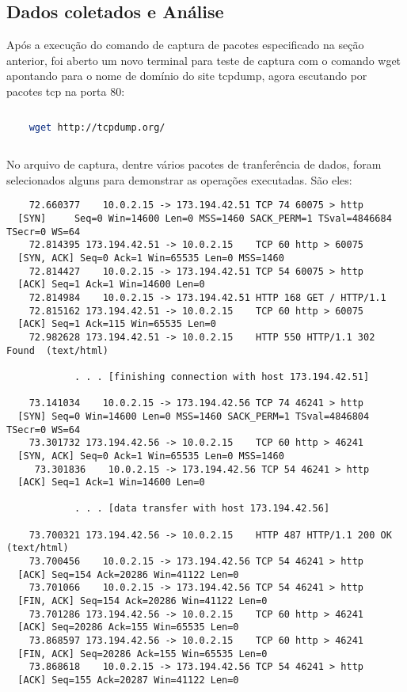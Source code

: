 \documentclass[a4paper]{report} %
\begin{document}
\subsection{Dados coletados e Análise}
\label{sub_http_dados}

	Após a execução do comando de captura de pacotes especificado na seção anterior, foi aberto um novo terminal para teste de captura com o comando wget apontando para o nome de domínio do site tcpdump, agora escutando por pacotes tcp na porta 80:

\begin{lstlisting}[language=bash]
	
	wget http://tcpdump.org/ 
	
\end{lstlisting}

	No arquivo de captura, dentre vários pacotes de tranferência de dados, foram selecionados alguns para demonstrar as operações executadas. São eles:
	
\begin{lstlisting}
	72.660377    10.0.2.15 -> 173.194.42.51 TCP 74 60075 > http 
  [SYN] 	Seq=0 Win=14600 Len=0 MSS=1460 SACK_PERM=1 TSval=4846684 TSecr=0 WS=64
	72.814395 173.194.42.51 -> 10.0.2.15    TCP 60 http > 60075 
  [SYN, ACK] Seq=0 Ack=1 Win=65535 Len=0 MSS=1460
	72.814427    10.0.2.15 -> 173.194.42.51 TCP 54 60075 > http 
  [ACK] Seq=1 Ack=1 Win=14600 Len=0
	72.814984    10.0.2.15 -> 173.194.42.51 HTTP 168 GET / HTTP/1.1 
	72.815162 173.194.42.51 -> 10.0.2.15    TCP 60 http > 60075 
  [ACK] Seq=1 Ack=115 Win=65535 Len=0
	72.982628 173.194.42.51 -> 10.0.2.15    HTTP 550 HTTP/1.1 302 Found  (text/html)
	
     		. . . [finishing connection with host 173.194.42.51]
	
	73.141034    10.0.2.15 -> 173.194.42.56 TCP 74 46241 > http 
  [SYN] Seq=0 Win=14600 Len=0 MSS=1460 SACK_PERM=1 TSval=4846804 TSecr=0 WS=64
	73.301732 173.194.42.56 -> 10.0.2.15    TCP 60 http > 46241 
  [SYN, ACK] Seq=0 Ack=1 Win=65535 Len=0 MSS=1460
     73.301836    10.0.2.15 -> 173.194.42.56 TCP 54 46241 > http 
  [ACK] Seq=1 Ack=1 Win=14600 Len=0
     
     		. . . [data transfer with host 173.194.42.56]
     					 					
	73.700321 173.194.42.56 -> 10.0.2.15    HTTP 487 HTTP/1.1 200 OK  (text/html)
	73.700456    10.0.2.15 -> 173.194.42.56 TCP 54 46241 > http 
  [ACK] Seq=154 Ack=20286 Win=41122 Len=0     					
	73.701066    10.0.2.15 -> 173.194.42.56 TCP 54 46241 > http 
  [FIN, ACK] Seq=154 Ack=20286 Win=41122 Len=0
	73.701286 173.194.42.56 -> 10.0.2.15    TCP 60 http > 46241
  [ACK] Seq=20286 Ack=155 Win=65535 Len=0
	73.868597 173.194.42.56 -> 10.0.2.15    TCP 60 http > 46241 
  [FIN, ACK] Seq=20286 Ack=155 Win=65535 Len=0
	73.868618    10.0.2.15 -> 173.194.42.56 TCP 54 46241 > http 
  [ACK] Seq=155 Ack=20287 Win=41122 Len=0  					
  
     
\end{lstlisting}
	
\end{document}
